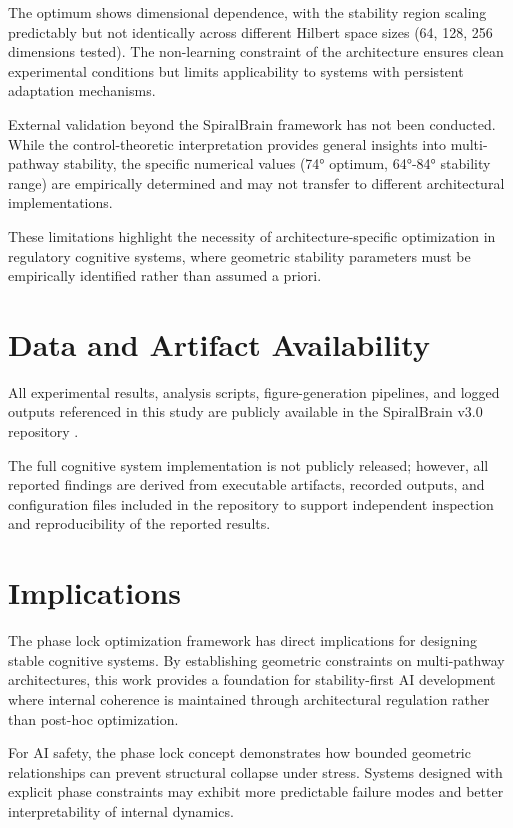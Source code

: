 \documentclass[12pt,a4paper]{report}
\begin{document}
The optimum shows dimensional dependence, with the stability region scaling predictably but not identically across different Hilbert space sizes (64, 128, 256 dimensions tested). The non-learning constraint of the architecture ensures clean experimental conditions but limits applicability to systems with persistent adaptation mechanisms.

External validation beyond the SpiralBrain framework has not been conducted. While the control-theoretic interpretation provides general insights into multi-pathway stability, the specific numerical values (74° optimum, 64°-84° stability range) are empirically determined and may not transfer to different architectural implementations.

These limitations highlight the necessity of architecture-specific optimization in regulatory cognitive systems, where geometric stability parameters must be empirically identified rather than assumed a priori.

\section*{Data and Artifact Availability}

All experimental results, analysis scripts, figure-generation pipelines, and logged outputs referenced in this study are publicly available in the SpiralBrain v3.0 repository \cite{SpiralBrainRepo}.

The full cognitive system implementation is not publicly released; however, all reported findings are derived from executable artifacts, recorded outputs, and configuration files included in the repository to support independent inspection and reproducibility of the reported results.

\section{Implications}

The phase lock optimization framework has direct implications for designing stable cognitive systems. By establishing geometric constraints on multi-pathway architectures, this work provides a foundation for stability-first AI development where internal coherence is maintained through architectural regulation rather than post-hoc optimization.

For AI safety, the phase lock concept demonstrates how bounded geometric relationships can prevent structural collapse under stress. Systems designed with explicit phase constraints may exhibit more predictable failure modes and better interpretability of internal dynamics.
\end{document}
